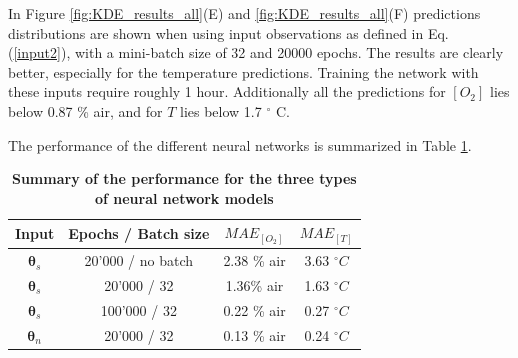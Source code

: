 \documentclass[9pt,twocolumn,twoside,pdftex]{optica}
\begin{document}

In Figure \ref{fig:KDE_results_all}(E) and \ref{fig:KDE_results_all}(F) predictions distributions are shown when using input observations as defined in Eq. (\ref{input2}), with a mini-batch size of 32 and 20000 epochs. The results are clearly better, especially for the temperature predictions. Training the network with these inputs require roughly 1 hour. Additionally all the predictions for $[O_2]$ lies below 0.87 \% air, and for $T$ lies below 1.7 $^\circ$ C. 



The performance of the different neural networks is summarized in Table \ref{TableMAE_summary}. 
\begin{table}[hbt]
\centering
\caption {\bf Summary of the performance for the three types of neural network models}

\begin{tabular}{ cccc}
\smallskip 
 Input & Epochs / Batch size & $MAE_{[O_2]}$ & $MAE_{[T]}$  \\ 
 \hline
${\pmb \theta}_s$ & 20'000 / \textrm{no batch} & 2.38 \% air & 3.63 $^\circ C$\\ 
${\pmb \theta}_s$ & 20'000 / 32 & 1.36\% air & 1.63 $^\circ C$\\ 
${\pmb \theta}_s$& 100'000 / 32 & 0.22 \% air & 0.27 $^\circ C$\\ 
${\pmb \theta}_n$ & 20'000 / 32 & 0.13 \% air & 0.24 $^\circ C$\\ 

\end{tabular}
\label{TableMAE_summary}
\end{table}
\end{document}
